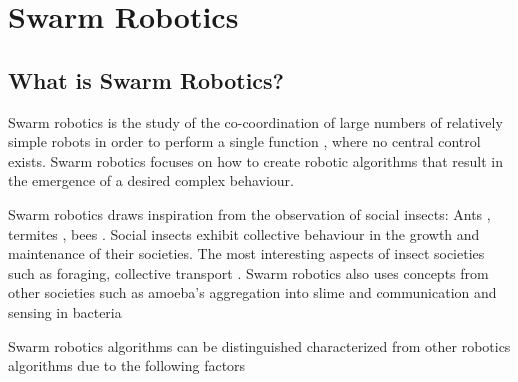 
\chapter{Swarm Robotics}
\label{chap:first}





\section{What is Swarm Robotics?}
\label{sec:first:definitionswarmrobotics}

Swarm robotics is the study of the co-coordination of large numbers of  relatively simple robots in order to perform a single function \cite{csahin2005swarm}, where no central control exists. Swarm robotics focuses on how to create robotic algorithms that result in the emergence of a desired complex behaviour.

Swarm robotics draws inspiration from the observation of social insects: Ants \cite{hoff2010two,alcoholfromants2012}, termites \cite{}, bees \cite{lee2012foraging}. Social insects exhibit collective behaviour in the growth and maintenance of their societies\cite{wilson1971insect, bailishive}. The most interesting aspects of insect societies such as foraging, collective transport . Swarm robotics also uses concepts from other societies such as amoeba's aggregation into slime and communication and sensing in bacteria

Swarm robotics algorithms can be distinguished characterized from other robotics algorithms due to the following factors

